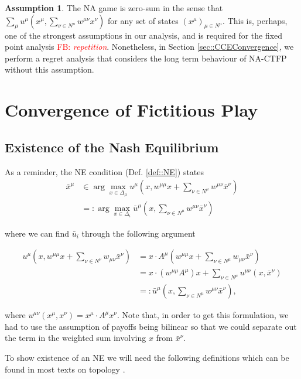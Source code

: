\documentclass{article}
\theoremstyle{definition}
\newtheorem{assumption}{Assumption}
\newcommand{\fb}[1]{\textcolor{red}{FB: \textit{#1}}}
\newcommand{\wmunu}{w^{\mu \nu}}
\newcommand{\xmu}{x^{\mu}}
\newcommand{\xnu}{x^{\nu}}
\newcommand{\NE}[1]{\bar{x}^{#1}}
\newcommand{\weightedsum}{ \sum_{\nu \in N^\mu} \wmunu \xnu}
\begin{document}
  \begin{assumption}\label{ass::zerosum}
    The NA game is zero-sum in the sense that $\sum_{\mu} u^\mu(\xmu,
    \weightedsum)$ for any set of states $(x^\mu)_{\mu \in
      N^\mu}$. This is, perhaps, one of the strongest assumptions in
    our analysis, and is required for the fixed point
    analysis \fb{repetition}. Nonetheless, in Section \ref{sec::CCEConvergence}, we
    perform a regret analysis that considers the long term behaviour
    of NA-CTFP without this assumption.
  \end{assumption}

\section{Convergence of Fictitious Play}

  \subsection{Existence of the Nash Equilibrium}
  \label{sec::ExistenceofNE}
  
  As a reminder, the NE condition (Def. \ref{def::NE}) states
%
  \begin{align}
    \NE{\mu} &\in \arg\max_{x \in \Delta_\mu} u^\mu(x, w^{\mu \mu}x + \sum_{\nu \in N^\mu} w^{\mu \nu} \NE{\nu}) \nonumber \\
    & =: \arg\max_{x \in \Delta_i} \bar{u}^\mu(x, \sum_{\nu \in N^\mu} w^{\mu \nu} \NE{\nu})
  \end{align}

  where we can find $\bar{u}_i$ through the following argument
  
  \begin{align}
    u^\mu(x, w^{\mu \mu} x + \sum_{\nu \in N^\nu} w_{\mu \nu} \NE{\nu}) & = x \cdot A^\mu (w^{\mu \mu} x + \sum_{\nu \in N^\mu} w_{\mu \nu} \NE{\nu}) \\
     & = x \cdot (w^{\mu \mu} A^\mu)  x + \sum_{\nu \in N^\mu} u^{\mu \nu}(x, \NE{\nu}) \\
     & =: \bar{u}^\mu(x, \sum_{\nu \in N^\mu} w^{\mu \nu} \NE{\nu}), \nonumber
  \end{align}
  
  where $u^{\mu \nu}(\xmu, x^\nu) = \xmu \cdot A^\mu x^\nu$. Note
  that, in order to get this formulation, we had to use the assumption
  of payoffs being bilinear so that we could separate out the term in
  the weighted sum involving $x$ from $\bar{x}^\nu$.
  
  To show existence of an NE we will need the following definitions which can be found in most texts on topology \cite{Munkres}.
  
\end{document}
